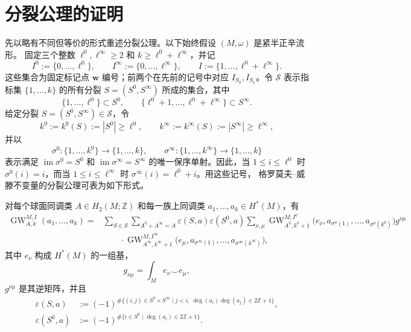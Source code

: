
\section{分裂公理的证明}\label{sec:10-8}

先以略有不同但等价的形式重述分裂公理。以下始终假设 $(M,\omega)$ 是紧半正辛流形。
固定三个整数 $\ell^0,\ell^\infty\geq2$ 和 $k\geq\ell^0+\ell^\infty$，并记
\[
  I^0:=\{0,\ldots,\ell^0\},\qquad
  I^\infty:=\{0,\ldots,\ell^\infty\},\qquad
  I:=\{1,\ldots,\ell^0+\ell^\infty\}.
\]
这些集合为固定标记点 $\mathbf w$ 编号；前两个在先前的记号中对应
$I_{S_0},I_{S_1}$。令 $\mathcal S$ 表示指标集 $\{1,\ldots,k\}$ 的所有分裂
$S=(S^0,S^\infty)$ 所成的集合，其中
\[
  \{1,\ldots,\ell^0\}\subset S^0,
  \qquad
  \{\ell^0+1,\ldots,\ell^0+\ell^\infty\}\subset S^\infty.
\]
给定分裂 $S=(S^0,S^\infty)\in\mathcal S$，令
\[
  k^0:=k^0(S):=|S^0|\geq\ell^0,
  \qquad
  k^\infty:=k^\infty(S):=|S^\infty|\geq\ell^\infty,
\]
并以
\[
  \sigma^0:\{1,\ldots,k^0\}\longrightarrow\{1,\ldots,k\},
  \qquad
  \sigma^\infty:\{1,\ldots,k^\infty\}\longrightarrow\{1,\ldots,k\}
\]
表示满足 $\operatorname{im}\sigma^0=S^0$ 和
$\operatorname{im}\sigma^\infty=S^\infty$ 的唯一保序单射。因此，当
$1\leq i\leq\ell^0$ 时 $\sigma^0(i)=i$，而当
$1\leq i\leq\ell^\infty$ 时 $\sigma^\infty(i)=\ell^0+i$。用这些记号，
格罗莫夫--威滕不变量的分裂公理可表为如下形式。

\begin{theorem}\label{thm:10-8-1}
对每个球面同调类 $A\in H_2(M;\mathbb Z)$ 和每一族上同调类
$a_1,\ldots,a_k\in H^*(M)$，有
\begin{align*}
  \operatorname{GW}_{A,k}^{M,I}(a_1,\ldots,a_k)
  ={}&\sum_{S\in\mathcal S}\sum_{A^0+A^\infty=A}
  \varepsilon(S,a)\varepsilon(S^0,a)\sum_{\nu,\mu}
  \operatorname{GW}_{A^0,k^0+1}^{M,I^0}
  \bigl(e_\nu,a_{\sigma^0(1)},\ldots,a_{\sigma^0(k^0)}\bigr)
  g^{\nu\mu}\\
  &\qquad{}\cdot
  \operatorname{GW}_{A^\infty,k^\infty+1}^{M,I^\infty}
  \bigl(e_\mu,a_{\sigma^\infty(1)},\ldots,
  a_{\sigma^\infty(k^\infty)}\bigr),
\end{align*}
其中 $e_\nu$ 构成 $H^*(M)$ 的一组基，
\[
  g_{\nu\mu}=\int_M e_\nu\smile e_\mu,
\]
$g^{\nu\mu}$ 是其逆矩阵，并且
\begin{align*}
  \varepsilon(S,a)
  &:={(-1)}^{\#\{(i,j)\in S^0\times S^\infty\mid
  j<i,\ \deg(a_i)\deg(a_j)\in2\mathbb Z+1\}},\\
  \varepsilon(S^0,a)
  &:={(-1)}^{\#\{i\in S^0\mid\deg(a_i)\in2\mathbb Z+1\}}.
\end{align*}
\end{theorem}

